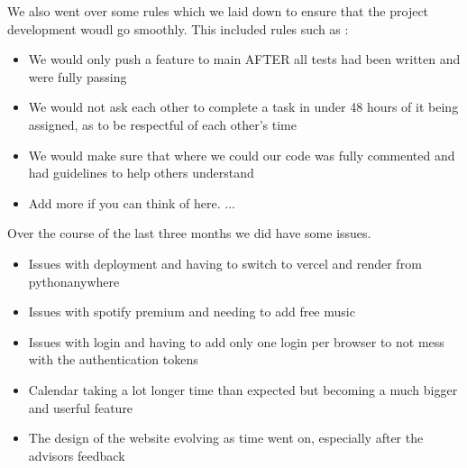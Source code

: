 We also went over some rules which we laid down to ensure that the project development woudl go smoothly. This included rules such as :


\begin{itemize}
    \item We would only push a feature to main AFTER all tests had been written and were fully passing
    \item We would not ask each other to complete a task in under 48 hours of it being assigned, as to be respectful of each other's time
    \item We would make sure that where we could our code was fully commented and had guidelines to help others understand
    \item Add more if you can think of here. ...
\end{itemize}

Over the course of the last three months we did have some issues.

\begin{itemize}
    \item Issues with deployment and having to switch to vercel and render from pythonanywhere
    \item Issues with spotify premium and needing to add free music
    \item Issues with login and having to add only one login per browser to not mess with the authentication tokens
    \item Calendar taking a lot longer time than expected but becoming a much bigger and userful feature
    \item The design of the website evolving as time went on, especially after the advisors feedback
\end{itemize}